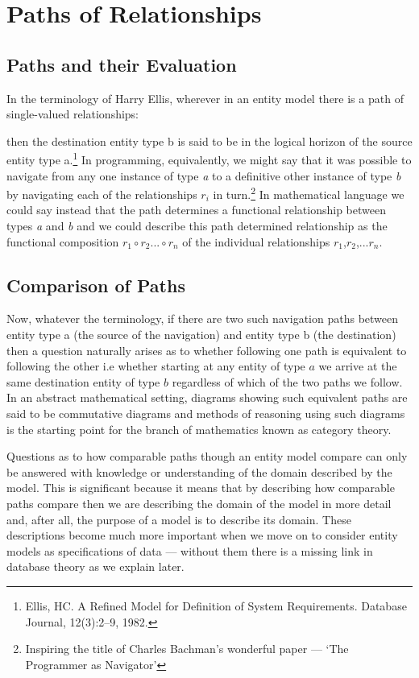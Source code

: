
\section{Paths of Relationships}
\label{PathsofRelationships}
\subsection{Paths and their Evaluation}
\mynote
In the terminology of Harry Ellis, wherever in an entity model there is a path of single-valued relationships:
\begin{center}

\end{center}
then the destination entity type b is said to be in the logical horizon of the source entity type a.\footnote{Ellis, HC. A Refined Model for Definition of System Requirements. Database Journal, 12(3):2--9, 1982.}
In programming, equivalently, we might say that it was possible to navigate from any one instance of type \textit{a} to a definitive other instance of type \textit{b} by navigating each of the relationships $r_i$ in turn.\footnote{Inspiring the title of Charles Bachman's wonderful paper --- `The Programmer as Navigator'}
 In mathematical language we could say instead that the path determines a functional relationship between types
\textit{a} and \textit{b} and we could describe this path determined relationship as the functional composition $r_1 \circ r_2 ... \circ r_n$ of the individual relationships $r_1$,$r_2$,...$r_n$.
\subsection{Comparison of Paths}
\mynote
Now, whatever the terminology, if there are two such navigation paths between entity type a (the source
of the navigation) and entity type b (the destination) then a question naturally arises as to whether following one path is equivalent to following the other i.e whether starting at any entity of type $a$ we arrive at the same destination entity of type $b$ regardless of which of the two paths we follow. In an abstract mathematical setting, diagrams showing such equivalent paths are said to be commutative diagrams and methods of reasoning using such diagrams is the starting point for the branch of mathematics known as category theory.

\mynote
Questions as to how comparable paths though an entity model compare can only be answered with knowledge or understanding of the domain described by the model. This is significant because it means that by describing how comparable paths compare then we are describing the domain of the model in more detail and, after all, the purpose of a model is to describe its domain. 
These descriptions become much more important when we move on to consider entity models as specifications of data --- without them there is a missing link in database theory as we explain later. 

